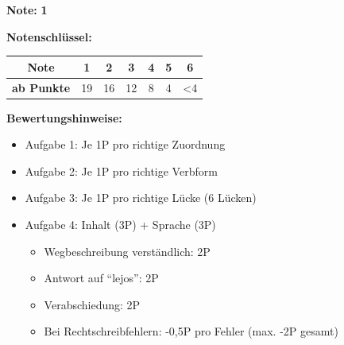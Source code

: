 \documentclass[11pt, a4paper]{article}
\newcommand{\lsg}[1]{\textcolor{loesung}{\textbf{#1}}}
\begin{document}
\vspace{10pt}

\begin{flushright}
\textbf{Note:} \lsg{1}
\end{flushright}

\vspace{1em}

\textbf{Notenschlüssel:}

\begin{tabular}{|c|c|c|c|c|c|c|}
\hline
\textbf{Note} & 1 & 2 & 3 & 4 & 5 & 6 \\
\hline
\textbf{ab Punkte} & 19 & 16 & 12 & 8 & 4 & <4 \\
\hline
\end{tabular}

\vspace{1em}

\textbf{Bewertungshinweise:}
\begin{itemize}
    \item Aufgabe 1: Je 1P pro richtige Zuordnung
    \item Aufgabe 2: Je 1P pro richtige Verbform
    \item Aufgabe 3: Je 1P pro richtige Lücke (6 Lücken)
    \item Aufgabe 4: Inhalt (3P) + Sprache (3P)
    \begin{itemize}
        \item Wegbeschreibung verständlich: 2P
        \item Antwort auf ``lejos'': 2P
        \item Verabschiedung: 2P
        \item Bei Rechtschreibfehlern: -0,5P pro Fehler (max. -2P gesamt)
    \end{itemize}
\end{itemize}
\end{document}
